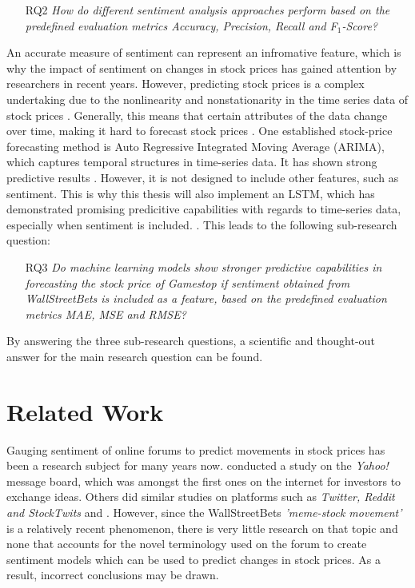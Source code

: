\documentclass[11pt, a4paper]{article}
\begin{document}
\begin{itemize}
    \item[RQ2] \emph{How do different sentiment analysis approaches perform based on the predefined evaluation metrics Accuracy, Precision, Recall and F$_1$-Score?}
\end{itemize}

An accurate measure of sentiment can represent an infromative feature, which is why the impact of sentiment on changes in stock prices has gained attention by researchers in recent years.
However, predicting stock prices is a complex undertaking due to the nonlinearity and nonstationarity in the time series data of stock prices \citep{mahla2019stockpriceprediction}. Generally, this means that certain
attributes of the data change over time, making it hard to forecast stock prices \citep{shetty2021nonstationary}. One established stock-price forecasting method is Auto Regressive Integrated Moving
Average (ARIMA), which captures temporal structures in time-series data. It has shown strong predictive results \citep{caginalp1995arima}. However, it is not designed to include other features, such as sentiment.
This is why this thesis will also implement an LSTM, which has demonstrated promising predicitive capabilities with regards to time-series data, especially when
sentiment is included. \citep{chen2021meanvariance, jin2020lstmsentiment}.
This leads to the following sub-research question:

\begin{itemize}
    \item[RQ3] \emph{Do machine learning models show stronger predictive capabilities in forecasting the stock price of Gamestop if sentiment obtained from WallStreetBets is included as a feature, based on the predefined evaluation metrics MAE, MSE and RMSE?}
\end{itemize}

By answering the three sub-research questions, a scientific and thought-out answer for the main research question can be found.



\section{Related Work}
Gauging sentiment of online forums to predict movements in stock prices has been a research subject for many years now. 
\cite{das2007yahoo} conducted a study on the \emph{Yahoo!} message board, which was amongst the first ones on the internet for investors to exchange ideas.
Others did similar studies on platforms such as \emph{Twitter, Reddit and StockTwits} and \citep{gu2020twtrsentiment, anand2021WallstreetbetsAgainstWallstreet, chousa2017socialmedia}.
However, since the WallStreetBets \emph{'meme-stock movement'} is a relatively recent phenomenon, there is very little research on that topic and none that accounts for the novel
terminology used on the forum to create sentiment models which can be used to predict changes in stock prices. As a result, incorrect conclusions may be drawn.
\end{document}
